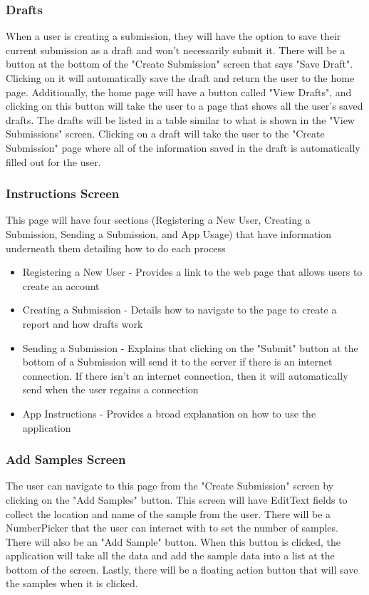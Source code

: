 \documentclass[onecolumn, draftclsnofoot, article, 10pt, compsoc]{IEEEtran}
\begin{document}
\subsubsection{Drafts}
When a user is creating a submission, they will have the option to save their current submission as a draft and won't necessarily submit it. There will be a button at the bottom of the "Create Submission" screen that says "Save Draft". Clicking on it will automatically save the draft and return the user to the home page. Additionally, the home page will have a button called "View Drafts", and clicking on this button will take the user to a page that shows all the user's saved drafts. The drafts will be listed in a table similar to what is shown in the "View Submissions" screen. Clicking on a draft will take the user to the "Create Submission" page where all of the information saved in the draft is automatically filled out for the user.

\subsubsection{Instructions Screen}
This page will have four sections (Registering a New User, Creating a Submission, Sending a Submission, and App Usage) that have information underneath them detailing how to do each process
\begin{itemize}

\item Registering a New User - Provides a link to the web page that allows users to create an account
\item Creating a Submission - Details how to navigate to the page to create a report and how drafts work 
\item Sending a Submission - Explains that clicking on the "Submit" button at the bottom of a Submission will send it to the server if there is an internet connection. If there isn't an internet connection, then it will automatically send when the user regains a connection 
\item App Instructions - Provides a broad explanation on how to use the application
\end{itemize}

\subsubsection{Add Samples Screen}
The user can navigate to this page from the "Create Submission" screen by clicking on the "Add Samples" button. This screen will have EditText fields to collect the location and name of the sample from the user. There will be a NumberPicker that the user can interact with to set the number of samples. There will also be an "Add Sample" button. When this button is clicked, the application will take all the data and add the sample data into a list at the bottom of the screen. Lastly, there will be a floating action button that will save the samples when it is clicked.
\end{document}
